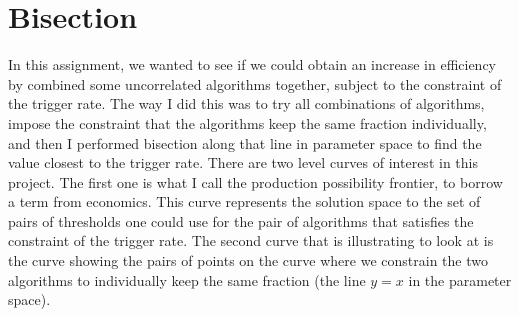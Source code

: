 \section{Bisection}
In this assignment, we wanted to see if we could obtain an increase in efficiency by combined some uncorrelated algorithms together, subject to the constraint of the trigger rate. 
The way I did this was to try all combinations of algorithms, impose the constraint that the algorithms keep the same fraction individually, and then I performed bisection along that line in parameter space to find the value closest to the trigger rate. 
There are two level curves of interest in this project. 
The first one is what I call the production possibility frontier, to borrow a term from economics. 
This curve represents the solution space to the set of pairs of thresholds one could use for the pair of algorithms that satisfies the constraint of the trigger rate.
The second curve that is illustrating to look at is the curve showing the pairs of points on the curve where we constrain the two algorithms to individually keep the same fraction (the line $y=x$ in the parameter space). 
